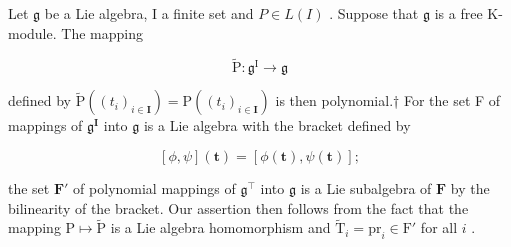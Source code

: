 Let \(\mathfrak{g}\) be a Lie algebra, I a finite set and \(P \in L(I)\) . Suppose that \(\mathfrak{g}\) is a free K-module. The mapping

\[
\tilde {\mathrm{P}} \colon \mathfrak {g} ^ {\mathrm{I}} \to \mathfrak {g}
\]

defined by \(\tilde{\mathrm{P}}((t_i)_{i\in \mathbf{I}}) = \mathrm{P}((t_i)_{i\in \mathbf{I}})\) is then polynomial.† For the set F of mappings of \(\mathfrak{g}^{\mathbf{I}}\) into \(\mathfrak{g}\) is a Lie algebra with the bracket defined by

\[
[ \phi , \psi ] (\boldsymbol {t}) = [ \phi (\boldsymbol {t}), \psi (\boldsymbol {t}) ];\tag{6}
\]

the set \(\mathbf{F}'\) of polynomial mappings of \(\mathfrak{g}^{\intercal}\) into \(\mathfrak{g}\) is a Lie subalgebra of \(\mathbf{F}\) by the bilinearity of the bracket. Our assertion then follows from the fact that the mapping \(\mathrm{P} \mapsto \tilde{\mathrm{P}}\) is a Lie algebra homomorphism and \(\tilde{\mathrm{T}}_i = \mathrm{pr}_i \in \mathrm{F}'\) for all \(i\) .

